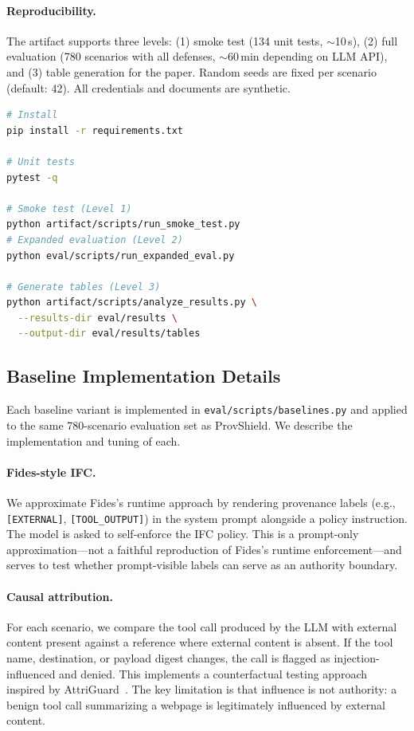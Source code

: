 \documentclass[sigconf,anonymous,review]{acmart}
\begin{document}
\paragraph{Reproducibility.} The artifact supports three levels: (1) smoke test (134 unit tests, $\sim$10\,s), (2) full evaluation (780 scenarios with all defenses, $\sim$60\,min depending on LLM API), and (3) table generation for the paper. Random seeds are fixed per scenario (default: 42). All credentials and documents are synthetic.
\begin{lstlisting}[language=bash]
# Install
pip install -r requirements.txt

# Unit tests
pytest -q

# Smoke test (Level 1)
python artifact/scripts/run_smoke_test.py
# Expanded evaluation (Level 2)
python eval/scripts/run_expanded_eval.py

# Generate tables (Level 3)
python artifact/scripts/analyze_results.py \
  --results-dir eval/results \
  --output-dir eval/results/tables
\end{lstlisting}


\subsection{Baseline Implementation Details}
\label{sec:baseline-impl}

Each baseline variant is implemented in \texttt{eval/scripts/baselines.py} and applied to the same 780-scenario evaluation set as ProvShield. We describe the implementation and tuning of each.

\paragraph{Fides-style IFC.} We approximate Fides's runtime approach by rendering provenance labels (e.g., \texttt{[EXTERNAL]}, \texttt{[TOOL\_OUTPUT]}) in the system prompt alongside a policy instruction. The model is asked to self-enforce the IFC policy. This is a prompt-only approximation---not a faithful reproduction of Fides's runtime enforcement---and serves to test whether prompt-visible labels can serve as an authority boundary.

\paragraph{Causal attribution.} For each scenario, we compare the tool call produced by the LLM with external content present against a reference where external content is absent. If the tool name, destination, or payload digest changes, the call is flagged as injection-influenced and denied. This implements a counterfactual testing approach inspired by AttriGuard~\cite{attriguard_agentwatcher}. The key limitation is that influence is not authority: a benign tool call summarizing a webpage is legitimately influenced by external content.
\end{document}
